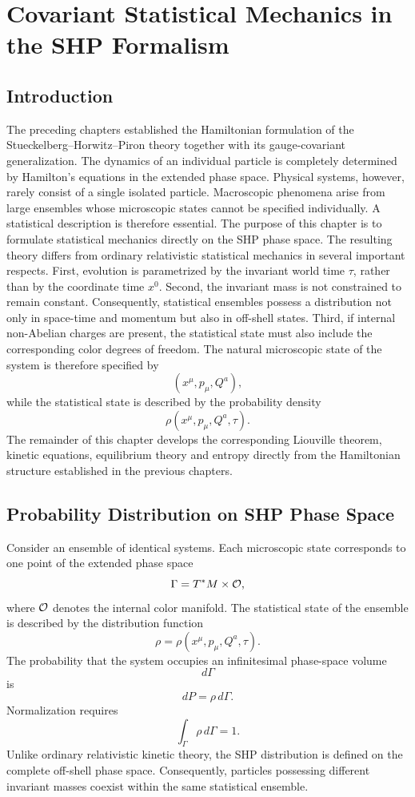 \chapter{Covariant Statistical Mechanics in the SHP Formalism}
\section{Introduction}
The preceding chapters established the Hamiltonian formulation of the
Stueckelberg--Horwitz--Piron theory together with its gauge-covariant
generalization. The dynamics of an individual particle is completely
determined by Hamilton's equations in the extended phase space.
Physical systems, however, rarely consist of a single isolated particle.
Macroscopic phenomena arise from large ensembles whose microscopic
states cannot be specified individually. A statistical description is
therefore essential.
The purpose of this chapter is to formulate statistical mechanics
directly on the SHP phase space. The resulting theory differs from
ordinary relativistic statistical mechanics in several important
respects.
First, evolution is parametrized by the invariant world time
\(\tau\), rather than by the coordinate time \(x^0\).
Second, the invariant mass is not constrained to remain constant.
Consequently, statistical ensembles possess a distribution not only in
space-time and momentum but also in off-shell states.
Third, if internal non-Abelian charges are present, the statistical
state must also include the corresponding color degrees of freedom.
The natural microscopic state of the system is therefore specified by
\[(x^\mu,p_\mu,Q^a),\]
while the statistical state is described by the probability density
\[\boxed{\rho(x^\mu,p_\mu,Q^a,\tau).}\]
The remainder of this chapter develops the corresponding Liouville
theorem, kinetic equations, equilibrium theory and entropy directly from
the Hamiltonian structure established in the previous chapters.
\section{Probability Distribution on SHP Phase Space}
Consider an ensemble of identical systems.
Each microscopic state corresponds to one point of the extended phase
space
\[\Gamma=T^*M\times{\cal O},\]
where \({\cal O}\) denotes the internal color manifold.
The statistical state of the ensemble is described by the distribution
function
\[\boxed{\rho=\rho(x^\mu,p_\mu,Q^a,\tau).}\]
The probability that the system occupies an infinitesimal phase-space
volume
\[d\Gamma\]
is
\[dP=\rho\,d\Gamma.\]
Normalization requires
\[\boxed{\int_\Gamma\rho\,d\Gamma=1.}\]
Unlike ordinary relativistic kinetic theory, the SHP distribution is
defined on the complete off-shell phase space.
Consequently, particles possessing different invariant masses coexist
within the same statistical ensemble.
